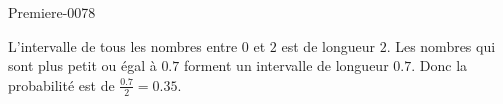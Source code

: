 
\begin{corrige}{Premiere-0078}

    L'intervalle de tous les nombres entre \( 0\) et \( 2\) est de longueur \( 2\). Les nombres qui sont plus petit ou égal à \( 0.7\) forment un intervalle de longueur \( 0.7\). Donc la probabilité est de \( \frac{ 0.7 }{ 2 }=0.35\).

\end{corrige}

